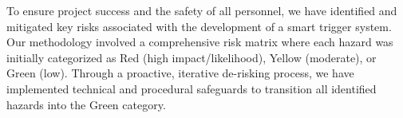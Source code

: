 




To ensure project success and the safety of all personnel, we have identified and mitigated key risks associated with the development of a smart trigger system. Our methodology involved a comprehensive risk matrix where each hazard was initially categorized as Red (high impact/likelihood), Yellow (moderate), or Green (low). Through a proactive, iterative de-risking process, we have implemented technical and procedural safeguards to transition all identified hazards into the Green category.

